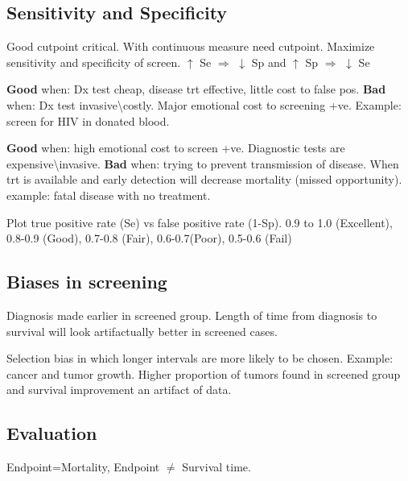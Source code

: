 \documentclass[landscape]{article}
\newcommand{\squeezeupp}{\vspace{-2mm}}
\begin{document}
\begin{multicols}{3}
	\squeezeupp{}
	\subsection{Sensitivity and Specificity}
		\squeezeupp{}
		\begin{description}
			\item[Trade-off] Good cutpoint critical. With continuous measure need cutpoint. Maximize sensitivity and specificity of screen. $\uparrow$ Se $\Rightarrow$ $\downarrow$ Sp and $\uparrow$ Sp $\Rightarrow$ $\downarrow$ Se
			\item[High Se, Low Sp] \textbf{Good} when: Dx test cheap, disease trt effective, little cost to false pos. \textbf{Bad} when: Dx test invasive\textbackslash costly. Major emotional cost to screening +ve. Example: screen for HIV in donated blood.
			\item[Low Se, High Sp] \textbf{Good} when: high emotional cost to screen +ve. Diagnostic tests are expensive\textbackslash invasive. \textbf{Bad} when: trying to prevent transmission of disease. When trt is available and early detection will decrease mortality (missed opportunity). example: fatal disease with no treatment.
			\item[ROC curve] Plot true positive rate (Se) vs false positive rate (1-Sp). 0.9 to 1.0 (Excellent), 0.8-0.9 (Good), 0.7-0.8 (Fair), 0.6-0.7(Poor), 0.5-0.6 (Fail)
		\end{description}
		
	\squeezeupp{}
	\subsection{Biases in screening}
	
		\squeezeupp{}
		\begin{description}
			\item[Lead time bias] Diagnosis made earlier in screened group. Length of time from diagnosis to survival will look artifactually better in screened cases.
			\item[Length time bias] Selection bias in which longer intervals are more likely to be chosen. Example: cancer and tumor growth. Higher proportion of tumors found in screened group and survival improvement an artifact of data.
		\end{description}

	\squeezeupp{}
	\subsection{Evaluation}
			\squeezeupp{}
			Endpoint=Mortality, Endpoint $\neq$ Survival time.


\end{multicols}
\end{document}

